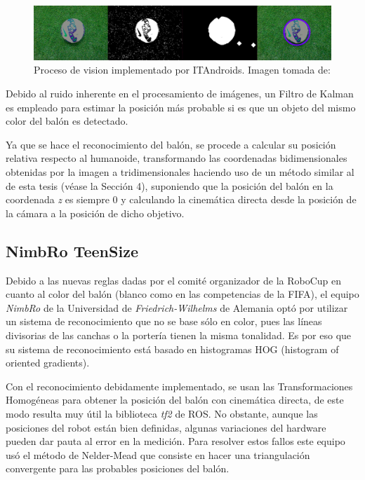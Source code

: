 \begin{figure}
\centering
\includegraphics[scale=0.25]{images/ITAndroids_vision.png}
\caption{Proceso de vision implementado por ITAndroids. Imagen tomada de: \cite{davi2017ITAndroids}}
\label{fig:ITAndroids_vision}
\end{figure}

	Debido al ruido inherente en el procesamiento de imágenes, un Filtro de Kalman es empleado para estimar la posición más probable si es que un objeto del mismo color del balón es detectado.
	
	Ya que se hace el reconocimiento del balón, se procede a calcular su posición relativa respecto al humanoide, transformando las coordenadas bidimensionales obtenidas por la imagen a tridimensionales haciendo uso de un método similar al de esta tesis (véase la Sección 4), suponiendo que la posición del balón en la coordenada \textit{z} es siempre 0 y calculando la cinemática directa desde la posición de la cámara a la posición de dicho objetivo.
	
	 \subsection*{NimbRo TeenSize}
	 Debido a las nuevas reglas dadas por el comité organizador de la RoboCup en cuanto al color del balón (blanco como en las competencias de la FIFA), el equipo \textit{NimbRo} de la Universidad de \textit{Friedrich-Wilhelms} de Alemania optó por utilizar un sistema de reconocimiento que no se base sólo en color, pues las líneas divisorias de las canchas o la portería tienen la misma tonalidad. Es por eso que su sistema de reconocimiento está basado en histogramas HOG (histogram of oriented gradients).
	
	 Con el reconocimiento debidamente implementado, se usan las Transformaciones Homogéneas para obtener la posición del balón con cinemática directa, de este modo resulta muy útil la biblioteca \textit{tf2} de ROS. No obstante, aunque las posiciones del robot están bien definidas, algunas variaciones del hardware pueden dar pauta al error en la medición. Para resolver estos fallos este equipo usó el método de Nelder-Mead que consiste en hacer una triangulación convergente para las probables posiciones del balón.
	 
